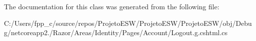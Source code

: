 The documentation for this class was generated from the following file\+:\begin{DoxyCompactItemize}
\item 
C\+:/\+Users/fpp\+\_\+c/source/repos/\+Projeto\+E\+S\+W/\+Projeto\+E\+S\+W/\+Projeto\+E\+S\+W/obj/\+Debug/netcoreapp2./\+Razor/\+Areas/\+Identity/\+Pages/\+Account/Logout.\+g.\+cshtml.\+cs\end{DoxyCompactItemize}
